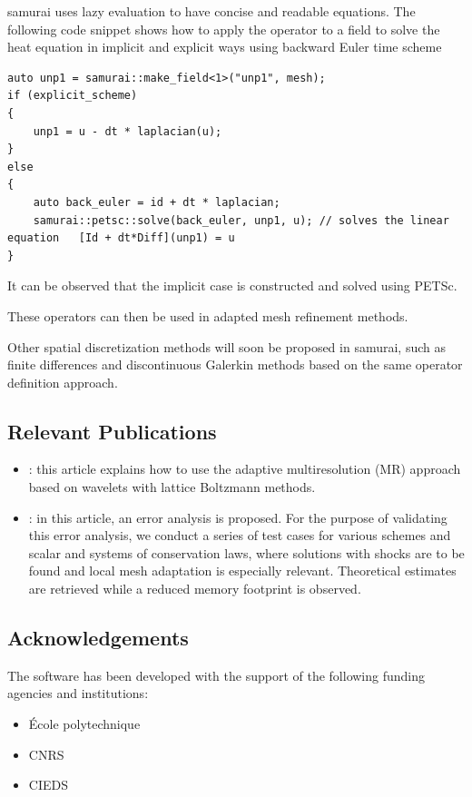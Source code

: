 samurai uses lazy evaluation to have concise and readable equations. The following code snippet shows how to apply the operator to a field to solve the heat equation in implicit and explicit ways using backward Euler time scheme

\begin{listing}[ht]
    \begin{verbatim}
auto unp1 = samurai::make_field<1>("unp1", mesh);
if (explicit_scheme)
{
    unp1 = u - dt * laplacian(u);
}
else
{
    auto back_euler = id + dt * laplacian;
    samurai::petsc::solve(back_euler, unp1, u); // solves the linear equation   [Id + dt*Diff](unp1) = u
}
\end{verbatim}
\end{listing}

It can be observed that the implicit case is constructed and solved using PETSc.

These operators can then be used in adapted mesh refinement methods.

Other spatial discretization methods will soon be proposed in samurai, such as finite differences and discontinuous Galerkin methods based on the same operator definition approach.

\subsection{Relevant Publications}
\label{sec:Samurai:publications}


\begin{itemize}
    \item \cite{bellotti_multidimensional_2022}: this article explains how to use the adaptive multiresolution (MR) approach based on wavelets with lattice Boltzmann methods.
    \item \cite{bellotti_multiresolution-based_2022}: in this article, an error analysis is proposed. For the purpose of validating this error analysis, we conduct a series of test cases for various schemes and scalar and systems of conservation laws, where solutions with shocks are to be found and local mesh adaptation is especially relevant. Theoretical estimates are retrieved while a reduced memory footprint is observed.
\end{itemize}

\subsection{Acknowledgements}
\label{sec::Samurai:acknowledgements}

The software has been developed with the support of the following funding agencies and institutions:
\begin{itemize}
    \item \'Ecole polytechnique
    \item CNRS
    \item CIEDS
 \end{itemize}
